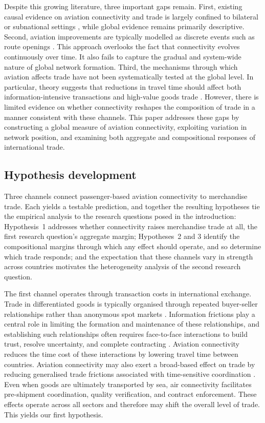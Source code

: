 Despite this growing literature, three important gaps remain. First, existing
causal evidence on aviation connectivity and trade is largely confined to
bilateral or subnational settings \citep{Cristea_2011,Soderlund_2023,Oum_2024}, while global
evidence remains primarily descriptive. Second, aviation improvements are
typically modelled as discrete events such as route openings
\citep{Jiang_2026}. This approach overlooks the fact that connectivity
evolves continuously over time. It also fails to capture the gradual and
system-wide nature of global network formation. Third, the mechanisms through
which aviation affects trade have not been systematically tested at the
global level. In particular, theory suggests that reductions in travel time
should affect both information-intensive transactions and high-value goods
trade \citep{Hummels_2013}. However, there is limited evidence on whether
connectivity reshapes the composition of trade in a manner consistent with
these channels. This paper addresses these gaps by constructing a global
measure of aviation connectivity, exploiting variation in network position,
and examining both aggregate and compositional responses of international
trade.

\subsection{Hypothesis development}
\label{sec:framework}
Three channels connect passenger-based aviation connectivity to merchandise
trade. Each yields a testable prediction, and together the resulting
hypotheses tie the empirical analysis to the research questions posed in the
introduction: Hypothesis~1 addresses whether connectivity raises merchandise
trade at all, the first research question's aggregate margin; Hypotheses~2
and 3 identify the compositional margins through which any effect should
operate, and so determine which trade responds; and the expectation that
these channels vary in strength across countries motivates the heterogeneity
analysis of the second research question.

The first channel operates through transaction costs in international
exchange. Trade in differentiated goods is typically organised through
repeated buyer-seller relationships rather than anonymous spot markets
\citep{Rauch_1999}. Information frictions play a central role in limiting the
formation and maintenance of these relationships, and establishing such
relationships often requires face-to-face interactions to build trust,
resolve uncertainty, and complete contracting \citep{Allen_2014}. Aviation
connectivity reduces the time cost of these interactions by lowering travel
time between countries. Aviation connectivity may also exert a broad-based
effect on trade by reducing generalised trade frictions associated with
time-sensitive coordination \citep{Jiang_2026}. Even when goods are
ultimately transported by sea, air connectivity facilitates pre-shipment
coordination, quality verification, and contract enforcement. These effects
operate across all sectors and therefore may shift the overall level of
trade. This yields our first hypothesis.

